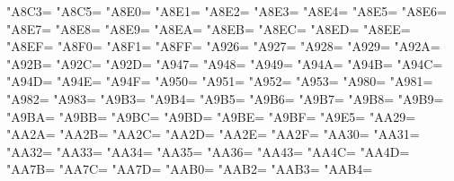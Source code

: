 \XeTeXcharclass"A8C3=\KclassCM
\XeTeXcharclass"A8C5=\KclassCM
\XeTeXcharclass"A8E0=\KclassCM
\XeTeXcharclass"A8E1=\KclassCM
\XeTeXcharclass"A8E2=\KclassCM
\XeTeXcharclass"A8E3=\KclassCM
\XeTeXcharclass"A8E4=\KclassCM
\XeTeXcharclass"A8E5=\KclassCM
\XeTeXcharclass"A8E6=\KclassCM
\XeTeXcharclass"A8E7=\KclassCM
\XeTeXcharclass"A8E8=\KclassCM
\XeTeXcharclass"A8E9=\KclassCM
\XeTeXcharclass"A8EA=\KclassCM
\XeTeXcharclass"A8EB=\KclassCM
\XeTeXcharclass"A8EC=\KclassCM
\XeTeXcharclass"A8ED=\KclassCM
\XeTeXcharclass"A8EE=\KclassCM
\XeTeXcharclass"A8EF=\KclassCM
\XeTeXcharclass"A8F0=\KclassCM
\XeTeXcharclass"A8F1=\KclassCM
\XeTeXcharclass"A8FF=\KclassCM
\XeTeXcharclass"A926=\KclassCM
\XeTeXcharclass"A927=\KclassCM
\XeTeXcharclass"A928=\KclassCM
\XeTeXcharclass"A929=\KclassCM
\XeTeXcharclass"A92A=\KclassCM
\XeTeXcharclass"A92B=\KclassCM
\XeTeXcharclass"A92C=\KclassCM
\XeTeXcharclass"A92D=\KclassCM
\XeTeXcharclass"A947=\KclassCM
\XeTeXcharclass"A948=\KclassCM
\XeTeXcharclass"A949=\KclassCM
\XeTeXcharclass"A94A=\KclassCM
\XeTeXcharclass"A94B=\KclassCM
\XeTeXcharclass"A94C=\KclassCM
\XeTeXcharclass"A94D=\KclassCM
\XeTeXcharclass"A94E=\KclassCM
\XeTeXcharclass"A94F=\KclassCM
\XeTeXcharclass"A950=\KclassCM
\XeTeXcharclass"A951=\KclassCM
\XeTeXcharclass"A952=\KclassCM
\XeTeXcharclass"A953=\KclassCM
\XeTeXcharclass"A980=\KclassCM
\XeTeXcharclass"A981=\KclassCM
\XeTeXcharclass"A982=\KclassCM
\XeTeXcharclass"A983=\KclassCM
\XeTeXcharclass"A9B3=\KclassCM
\XeTeXcharclass"A9B4=\KclassCM
\XeTeXcharclass"A9B5=\KclassCM
\XeTeXcharclass"A9B6=\KclassCM
\XeTeXcharclass"A9B7=\KclassCM
\XeTeXcharclass"A9B8=\KclassCM
\XeTeXcharclass"A9B9=\KclassCM
\XeTeXcharclass"A9BA=\KclassCM
\XeTeXcharclass"A9BB=\KclassCM
\XeTeXcharclass"A9BC=\KclassCM
\XeTeXcharclass"A9BD=\KclassCM
\XeTeXcharclass"A9BE=\KclassCM
\XeTeXcharclass"A9BF=\KclassCM
\XeTeXcharclass"A9E5=\KclassCM
\XeTeXcharclass"AA29=\KclassCM
\XeTeXcharclass"AA2A=\KclassCM
\XeTeXcharclass"AA2B=\KclassCM
\XeTeXcharclass"AA2C=\KclassCM
\XeTeXcharclass"AA2D=\KclassCM
\XeTeXcharclass"AA2E=\KclassCM
\XeTeXcharclass"AA2F=\KclassCM
\XeTeXcharclass"AA30=\KclassCM
\XeTeXcharclass"AA31=\KclassCM
\XeTeXcharclass"AA32=\KclassCM
\XeTeXcharclass"AA33=\KclassCM
\XeTeXcharclass"AA34=\KclassCM
\XeTeXcharclass"AA35=\KclassCM
\XeTeXcharclass"AA36=\KclassCM
\XeTeXcharclass"AA43=\KclassCM
\XeTeXcharclass"AA4C=\KclassCM
\XeTeXcharclass"AA4D=\KclassCM
\XeTeXcharclass"AA7B=\KclassCM
\XeTeXcharclass"AA7C=\KclassCM
\XeTeXcharclass"AA7D=\KclassCM
\XeTeXcharclass"AAB0=\KclassCM
\XeTeXcharclass"AAB2=\KclassCM
\XeTeXcharclass"AAB3=\KclassCM
\XeTeXcharclass"AAB4=\KclassCM

